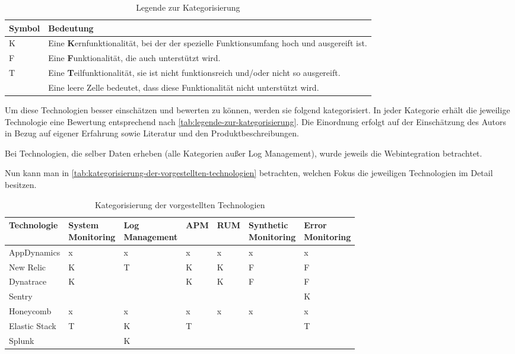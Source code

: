 \begin{wraptable}[13]{r}{0.55\linewidth}
\centering
\vspace{-\baselineskip}
\begin{tabularx}{\linewidth}{|l|X|}
  \hline
  Symbol & Bedeutung \\
  \hline
  K & Eine \textbf{K}ernfunktionalität, bei der der spezielle Funktionsumfang hoch und ausgereift ist. \\
  \hline
  F & Eine \textbf{F}unktionalität, die auch unterstützt wird. \\
  \hline
  T & Eine \textbf{T}eilfunktionalität, sie ist nicht funktionsreich und/oder nicht so ausgereift. \\
  \hline
   & Eine leere Zelle bedeutet, dass diese Funktionalität nicht unterstützt wird. \\
  \hline
\end{tabularx}
\caption{Legende zur Kategorisierung}
\label{tab:legende-zur-kategorisierung}
\end{wraptable}

Um diese Technologien besser einschätzen und bewerten zu können, werden sie folgend kategorisiert. In jeder Kategorie erhält die jeweilige Technologie eine Bewertung entsprechend nach \autoref{tab:legende-zur-kategorisierung}. Die Einordnung erfolgt auf der Einschätzung des Autors in Bezug auf eigener Erfahrung sowie Literatur und den Produktbeschreibungen.

Bei Technologien, die selber Daten erheben (alle Kategorien außer Log Management), wurde jeweils die Webintegration betrachtet. 

Nun kann man in \autoref{tab:kategorisierung-der-vorgestellten-technologien} betrachten, welchen Fokus die jeweiligen Technologien im Detail besitzen.

\begin{table}[H]
\centering
\begin{tabular}{|l|l|l|l|l|l|l|}
  \hline
  Technologie & \makecell{System\\Monitoring} & \makecell{Log\\Management} & APM & RUM & \makecell{Synthetic\\Monitoring} & \makecell{Error\\Monitoring} \\
  \hline
  AppDynamics   & x & x & x & x & x & x \\
  \hline
  New Relic     & K & T & K & K & F & F \\
  \hline
  Dynatrace     & K &   & K & K & F & F \\
  \hline
  Sentry        &   &   &   &   &   & K \\
  \hline
  Honeycomb     & x & x & x & x & x & x \\
  \hline
  Elastic Stack & T & K & T &   &   & T \\
  \hline
  Splunk        &   & K &   &   &   &   \\
  \hline
\end{tabular}
\caption{Kategorisierung der vorgestellten Technologien}
\label{tab:kategorisierung-der-vorgestellten-technologien}
\end{table}